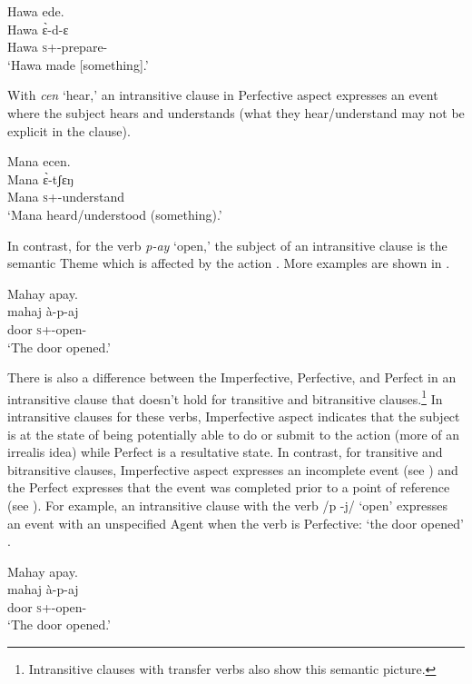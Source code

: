 \ea \label{ex:9:25}
Hawa  ede. \\
\gll  Hawa   \`ɛ{}-d-ɛ \\
      Hawa  \textsc{s}+{\PFV}-prepare-{\CL}\\
\glt  ‘Hawa made [something].’ 
\z

With \textit{cen} ‘hear,’ an intransitive clause in Perfective aspect  expresses an event where the subject hears and understands (what they hear/understand may not be explicit in the clause). 

\ea \label{ex:9:26}
Mana  ecen. \\
\gll  Mana   \`ɛ{}-tʃɛŋ \\
      Mana  \textsc{s}+{\PFV}-understand\\
\glt  ‘Mana heard/understood (something).’
\z

In contrast, for the verb \textit{p-ay} ‘open,’ the subject of an intransitive clause is the semantic Theme which is affected by the action . More examples are shown in .

\clearpage
\ea \label{ex:9:27}
Mahay  apay.\\
\gll  mahaj   à-p-aj\\
      door  \textsc{s}+{\PFV}-open{}-{\CL}\\
\glt  ‘The door opened.’ 
\z

There is also a difference between the Imperfective, Perfective, and Perfect in an intransitive clause that doesn’t hold for transitive and bitransitive clauses.\footnote{Intransitive clauses with transfer verbs  also show this semantic picture.} In intransitive clauses for these verbs, Imperfective aspect indicates that the subject is at the state of being potentially able to do or submit to the action (more of an irrealis idea) while Perfect is a resultative state. In contrast, for transitive and bitransitive clauses, Imperfective aspect expresses an incomplete event  (see ) and the Perfect expresses that the event was completed prior to a point of reference (see ).  For example, an intransitive clause with the verb /p -j/ ‘open’ expresses an event with an unspecified Agent when the verb is Perfective: ‘the door opened’ . 

\ea \label{ex:9:28}
Mahay  apay.\\
\gll  mahaj à-p-aj\\
      door  \textsc{s}+{\PFV}-open{}-{\CL}\\
\glt  ‘The door opened.’
\z

